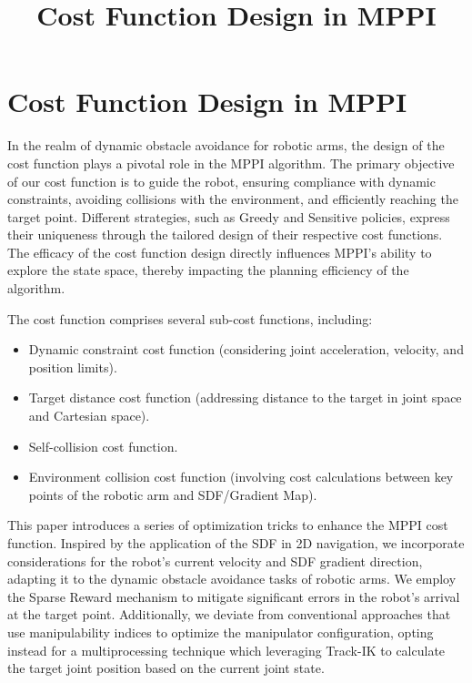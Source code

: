 \documentclass{article}
\begin{document}
	\title{Cost Function Design in MPPI}
	\maketitle
	
	\section{Cost Function Design in MPPI}
	
	In the realm of dynamic obstacle avoidance for robotic arms, the design of the cost function plays a pivotal role in the MPPI algorithm. The primary objective of our cost function is to guide the robot, ensuring compliance with dynamic constraints, avoiding collisions with the environment, and efficiently reaching the target point. Different strategies, such as Greedy and Sensitive policies, express their uniqueness through the tailored design of their respective cost functions. The efficacy of the cost function design directly influences MPPI's ability to explore the state space, thereby impacting the planning efficiency of the algorithm.
	
	The cost function comprises several sub-cost functions, including:
	\begin{itemize}
		\item Dynamic constraint cost function (considering joint acceleration, velocity, and position limits).
		\item Target distance cost function (addressing distance to the target in joint space and Cartesian space).
		\item Self-collision cost function.
		\item Environment collision cost function (involving cost calculations between key points of the robotic arm and SDF/Gradient Map).
	\end{itemize}
	
	This paper introduces a series of optimization tricks to enhance the MPPI cost function. Inspired by the application of the SDF in 2D navigation, we incorporate considerations for the robot's current velocity and SDF gradient direction, adapting it to the dynamic obstacle avoidance tasks of robotic arms. We employ the Sparse Reward mechanism to mitigate significant errors in the robot's arrival at the target point. Additionally, we deviate from conventional approaches that use manipulability indices to optimize the manipulator configuration, opting instead for a multiprocessing technique which leveraging  Track-IK to calculate the target joint position based on the current joint state.
	
\end{document}
